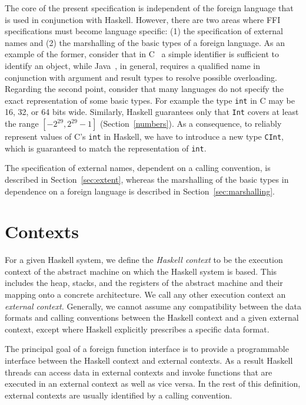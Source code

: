 The core of the present specification is independent of the foreign language
that is used in conjunction with Haskell.  However, there are two areas where
FFI specifications must become language specific: (1) the specification of
external names and (2) the marshalling of the basic types of a foreign
language.  As an example of the former, consider that in C~\cite{C} a simple
identifier is sufficient to identify an object, while
Java~\cite{gosling-etal:Java}, in general, requires a qualified name in
conjunction with argument and result types to resolve possible overloading.
Regarding the second point, consider that many languages do not specify the
exact representation of some basic types.  For example the type \mbox{\tt int} in
C may be 16, 32, or 64 bits wide.  Similarly, Haskell guarantees
only that \mbox{\tt Int} covers at least the range \([-2^{29}, 2^{29} - 1]\) (Section~\ref{numbers}).  As
a consequence, to reliably represent values of C's \mbox{\tt int} in Haskell, we
have to introduce a new type \mbox{\tt CInt}, which is guaranteed to match the
representation of \mbox{\tt int}.

The specification of external names, dependent on a calling convention, is
described in Section~\ref{sec:extent}, whereas the marshalling of the basic
types in dependence on a foreign language is described in
Section~\ref{sec:marshalling}.

\section{Contexts}

For a given Haskell system, we define the \emph{Haskell context} to be the
execution context of the abstract machine on which the Haskell system is
based.  This includes the heap, stacks, and the registers of the abstract
machine and their mapping onto a concrete architecture.  We call any other
execution context an \emph{external context.}  Generally, we cannot assume any
compatibility between the data formats and calling conventions between the
Haskell context and a given external context, except where Haskell explicitly prescribes a specific data format.

The principal goal of a foreign function interface is to provide a
programmable interface between the Haskell context and external
contexts.  As a result Haskell threads can access data in external
contexts and invoke functions that are executed in an external context
as well as vice versa.  In the rest of this definition, external
contexts are usually identified by a calling convention.

